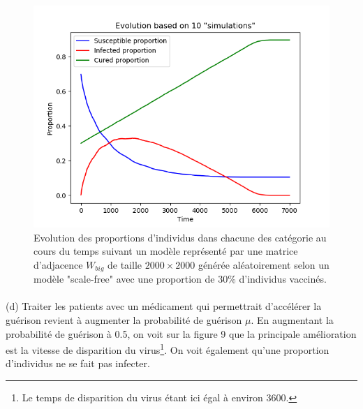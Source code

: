 \documentclass[a4paper, 12pt, oneside]{article}
\begin{document}
\begin{figure}[H]
	\centering
	\includegraphics[scale=1]{Wbig_dense_initial_immunised.png} 
	\caption{Evolution des proportions d'individus dans chacune des catégorie au cours du temps suivant un modèle représenté par une matrice d'adjacence $W_{big}$ de taille $2000 \times 2000$ générée aléatoirement selon un modèle "scale-free" avec une proportion de 30\% d'individus vaccinés.}
\end{figure}

\paragraph{}(d) Traiter les patients avec un médicament qui permettrait d'accélérer la guérison revient à augmenter la probabilité de guérison $\mu$. En augmentant la probabilité de guérison à 0.5, on voit sur la figure 9 que la principale amélioration est la vitesse de disparition du virus\footnote{Le temps de disparition du virus étant ici égal à environ 3600.}. On voit également qu'une proportion d'individus ne se fait pas infecter.
\end{document}
